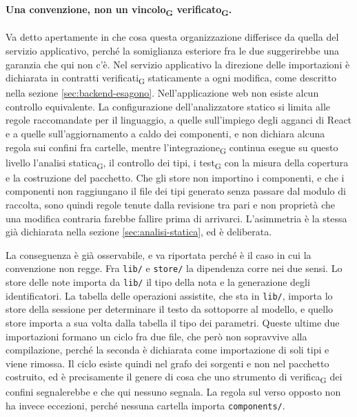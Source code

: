 \documentclass[a4paper, 10pt]{article}
\begin{document}
\paragraph{Una convenzione, non un vincolo\textsubscript{G} verificato\textsubscript{G}.}
Va detto apertamente in che cosa questa organizzazione differisce da quella del servizio applicativo, perché la somiglianza esteriore fra le due suggerirebbe una garanzia che qui non c'è. Nel servizio applicativo la direzione delle importazioni è dichiarata in contratti verificati\textsubscript{G} staticamente a ogni modifica, come descritto nella sezione \ref{sec:backend-esagono}. Nell'applicazione web non esiste alcun controllo equivalente. La configurazione dell'analizzatore statico si limita alle regole raccomandate per il linguaggio, a quelle sull'impiego degli agganci di React e a quelle sull'aggiornamento a caldo dei componenti, e non dichiara alcuna regola sui confini fra cartelle, mentre l'integrazione\textsubscript{G} continua esegue su questo livello l'analisi statica\textsubscript{G}, il controllo dei tipi, i test\textsubscript{G} con la misura della copertura e la costruzione del pacchetto. Che gli store non importino i componenti, e che i componenti non raggiungano il file dei tipi generato senza passare dal modulo di raccolta, sono quindi regole tenute dalla revisione tra pari e non proprietà che una modifica contraria farebbe fallire prima di arrivarci. L'asimmetria è la stessa già dichiarata nella sezione \ref{sec:analisi-statica}, ed è deliberata.

La conseguenza è già osservabile, e va riportata perché è il caso in cui la convenzione non regge. Fra \texttt{lib/} e \texttt{store/} la dipendenza corre nei due sensi. Lo store delle note importa da \texttt{lib/} il tipo della nota e la generazione degli identificatori. La tabella delle operazioni assistite, che sta in \texttt{lib/}, importa lo store della sessione per determinare il testo da sottoporre al modello, e quello store importa a sua volta dalla tabella il tipo dei parametri. Queste ultime due importazioni formano un ciclo fra due file, che però non sopravvive alla compilazione, perché la seconda è dichiarata come importazione di soli tipi e viene rimossa. Il ciclo esiste quindi nel grafo dei sorgenti e non nel pacchetto costruito, ed è precisamente il genere di cosa che uno strumento di verifica\textsubscript{G} dei confini segnalerebbe e che qui nessuno segnala. La regola sul verso opposto non ha invece eccezioni, perché nessuna cartella importa \texttt{components/}.
\end{document}
